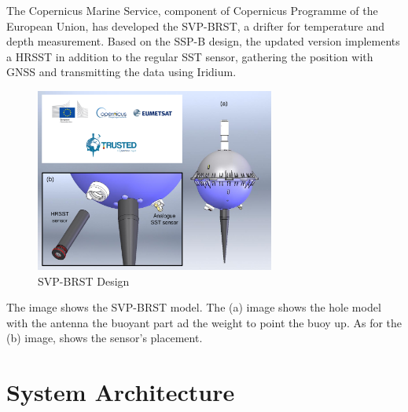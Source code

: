 The Copernicus Marine Service, component of Copernicus Programme of the 
European Union, has developed the SVP-BRST, a drifter for temperature and depth measurement.
Based on the SSP-B design, the updated version implements a HRSST in addition to the regular 
SST sensor, gathering the position with GNSS and transmitting the data using Iridium.
\begin{figure}[H]
    \centering
    \includegraphics[width=0.7\textwidth]{images/chapter/analysis/svp.png}  %
    \caption{SVP-BRST Design}
    \label{fig:SVP-BRST Design}        
\end{figure}
The image shows the SVP-BRST model. The (a) image shows the hole model with the antenna the buoyant part ad the weight to point the buoy up.
As for the (b) image, shows the sensor's placement. 





\section{System Architecture}

